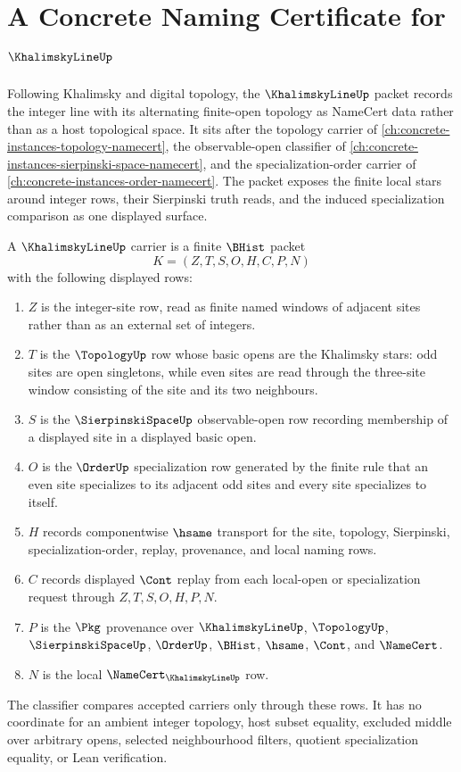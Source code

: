 \chapter{A Concrete Naming Certificate for $\KhalimskyLineUp$}
\label{ch:concrete-instances-khalimsky-line-namecert}

Following Khalimsky and digital topology, the $\KhalimskyLineUp$ packet records the integer line with its alternating finite-open topology as NameCert data rather than as a host topological space. It sits after the topology carrier of \autoref{ch:concrete-instances-topology-namecert}, the observable-open classifier of \autoref{ch:concrete-instances-sierpinski-space-namecert}, and the specialization-order carrier of \autoref{ch:concrete-instances-order-namecert}. The packet exposes the finite local stars around integer rows, their Sierpinski truth reads, and the induced specialization comparison as one displayed surface.

\begin{definition}
\label{def:khalimsky-line-carrier}
A $\KhalimskyLineUp$ carrier is a finite $\BHist$ packet
$$
K=(Z,T,S,O,H,C,P,N)
$$
with the following displayed rows:
\begin{enumerate}
\item $Z$ is the integer-site row, read as finite named windows of adjacent sites rather than as an external set of integers.
\item $T$ is the $\TopologyUp$ row whose basic opens are the Khalimsky stars: odd sites are open singletons, while even sites are read through the three-site window consisting of the site and its two neighbours.
\item $S$ is the $\SierpinskiSpaceUp$ observable-open row recording membership of a displayed site in a displayed basic open.
\item $O$ is the $\OrderUp$ specialization row generated by the finite rule that an even site specializes to its adjacent odd sites and every site specializes to itself.
\item $H$ records componentwise $\hsame$ transport for the site, topology, Sierpinski, specialization-order, replay, provenance, and local naming rows.
\item $C$ records displayed $\Cont$ replay from each local-open or specialization request through $Z,T,S,O,H,P,N$.
\item $P$ is the $\Pkg$ provenance over $\KhalimskyLineUp$, $\TopologyUp$, $\SierpinskiSpaceUp$, $\OrderUp$, $\BHist$, $\hsame$, $\Cont$, and $\NameCert$.
\item $N$ is the local $\NameCert_{\KhalimskyLineUp}$ row.
\end{enumerate}
The classifier compares accepted carriers only through these rows. It has no coordinate for an ambient integer topology, host subset equality, excluded middle over arbitrary opens, selected neighbourhood filters, quotient specialization equality, or Lean verification.
\end{definition}

